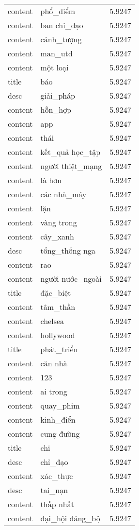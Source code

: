 \documentclass{article}
\begin{document}
\begin{tabular}{lll}
content & phổ\_điểm & 5.9247\\
content & ban chỉ\_đạo & 5.9247\\
content & cảnh\_tượng & 5.9247\\
content & man\_utd & 5.9247\\
content & một loại & 5.9247\\
title & báo & 5.9247\\
desc & giải\_pháp & 5.9247\\
content & hỗn\_hợp & 5.9247\\
content & app & 5.9247\\
content & thái & 5.9247\\
content & kết\_quả học\_tập & 5.9247\\
content & người thiệt\_mạng & 5.9247\\
content & là hơn & 5.9247\\
content & các nhà\_máy & 5.9247\\
content & lặn & 5.9247\\
content & vàng trong & 5.9247\\
content & cây\_xanh & 5.9247\\
desc & tổng\_thống nga & 5.9247\\
content & rao & 5.9247\\
content & người nước\_ngoài & 5.9247\\
title & đặc\_biệt & 5.9247\\
content & tâm\_thần & 5.9247\\
content & chelsea & 5.9247\\
content & hollywood & 5.9247\\
title & phát\_triển & 5.9247\\
content & căn nhà & 5.9247\\
content & 123 & 5.9247\\
content & ai trong & 5.9247\\
content & quay\_phim & 5.9247\\
content & kinh\_điển & 5.9247\\
content & cung đường & 5.9247\\
title & chi & 5.9247\\
desc & chỉ\_đạo & 5.9247\\
content & xác\_thực & 5.9247\\
desc & tai\_nạn & 5.9247\\
content & thấp nhất & 5.9247\\
content & đại\_hội đảng\_bộ & 5.9247\\

\end{tabular}
\end{document}
